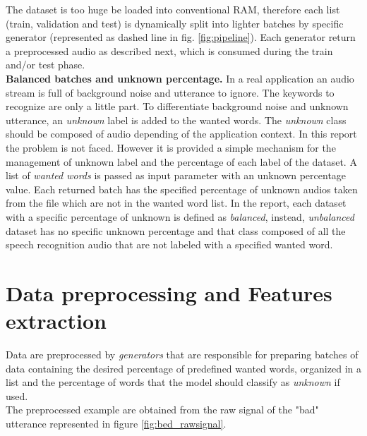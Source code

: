 The dataset is too huge be loaded into conventional RAM, therefore each list (train, validation and test) is dynamically split into lighter batches by specific generator (represented as dashed line in fig. \ref{fig:pipeline}). Each generator return a preprocessed audio as described next, which is consumed during the train and/or test phase.\\
\textbf{Balanced batches and unknown percentage.} In a real application an audio stream is full of background noise and utterance to ignore. The keywords to recognize are only a little part. To differentiate background noise and unknown utterance, an \textit{unknown} label is added to the wanted words. The \textit{unknown} class should be composed of audio depending of the application context. In this report the problem is not faced. However it is provided a simple mechanism for the management of unknown label and the percentage of each label of the dataset. A list of \textit{wanted words} is passed as input parameter with an unknown percentage value. Each returned batch has the specified percentage of unknown audios taken from the file which are not in the wanted word list. In the report, each dataset with a specific percentage of unknown is defined as \textit{balanced}, instead, \textit{unbalanced} dataset has no specific unknown percentage and that class composed of all the speech recognition audio that are not labeled with a specified wanted word.


\section{Data preprocessing and Features extraction}
\label{sec:model}

\noindent Data are preprocessed by \textit{generators} that are responsible for preparing batches of data containing the desired percentage of predefined wanted words, organized in a list and the percentage of words that the model should classify as \textit{unknown} if used.\\
The preprocessed example are obtained from the raw signal of the "bad" utterance represented in figure \ref{fig:bed_rawsignal}.\\


